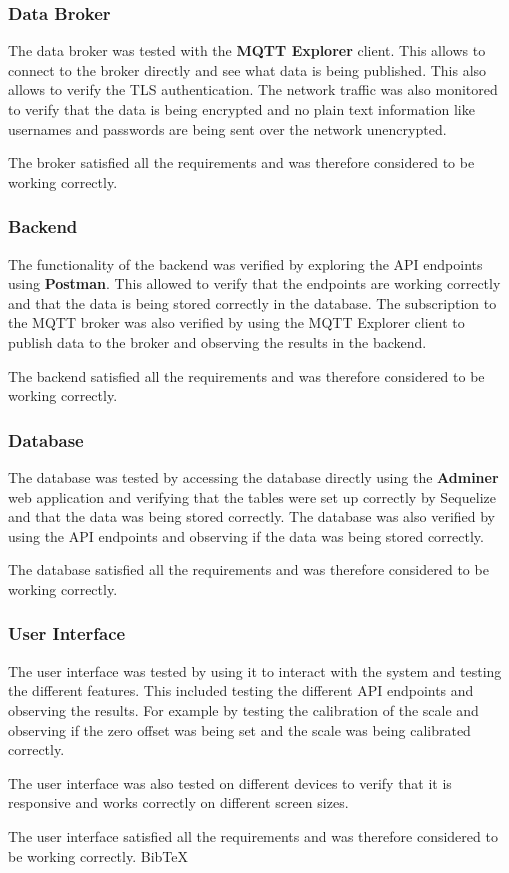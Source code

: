 \subsubsection{Data Broker}
The data broker was tested with the \textbf{MQTT Explorer} client. This allows to connect to the broker directly and see what data is being published. This also allows to verify the TLS authentication. The network traffic was also monitored to verify that the data is being encrypted and no plain text information like usernames and passwords are being sent over the network unencrypted.

The broker satisfied all the requirements and was therefore considered to be working correctly.

\subsubsection{Backend}
The functionality of the backend was verified by exploring the API endpoints using \textbf{Postman}. This allowed to verify that the endpoints are working correctly and that the data is being stored correctly in the database. The subscription to the MQTT broker was also verified by using the MQTT Explorer client to publish data to the broker and observing the results in the backend.

The backend satisfied all the requirements and was therefore considered to be working correctly.

\subsubsection{Database}
The database was tested by accessing the database directly using the \textbf{Adminer} web application and verifying that the tables were set up correctly by Sequelize and that the data was being stored correctly. The database was also verified by using the API endpoints and observing if the data was being stored correctly.

The database satisfied all the requirements and was therefore considered to be working correctly.

\subsubsection{User Interface}
The user interface was tested by using it to interact with the system and testing the different features. This included testing the different API endpoints and observing the results. For example by testing the calibration of the scale and observing if the zero offset was being set and the scale was being calibrated correctly.

The user interface was also tested on different devices to verify that it is responsive and works correctly on different screen sizes.

The user interface satisfied all the requirements and was therefore considered to be working correctly.
\Gls{BibTeX}